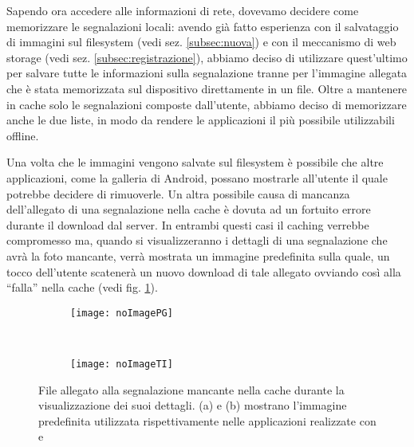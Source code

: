             Sapendo ora accedere alle informazioni di rete, dovevamo decidere
            come memorizzare le segnalazioni locali: avendo già fatto
            esperienza con il salvataggio di immagini sul filesys\-tem (vedi
            sez. \ref{subsec:nuova}) e con il meccanismo di web
            storage (vedi sez. \ref{subsec:registrazione}), abbiamo deciso di
            utilizzare quest'ultimo per salvare tutte le informazioni sulla
            segnalazione tranne per l'immagine allegata che è stata memorizzata
            sul dispositivo direttamente in un file. Oltre a mantenere in cache
            solo le segnalazioni composte dall'utente, abbiamo deciso di
            memorizzare anche le due liste, in modo da rendere le applicazioni
            il più possibile utilizzabili offline.

            Una volta che le immagini vengono salvate sul filesys\-tem è
            possibile che altre applicazioni, come la galleria di Android,
            possano mostrarle all'utente il quale potrebbe decidere di
            rimuoverle. Un altra possibile causa di mancanza dell'allegato di
            una segnalazione nella cache è dovuta ad un fortuito errore durante
            il download dal server. In entrambi questi casi il caching verrebbe
            compromesso ma, quando si visualizzeranno i dettagli di una
            segnalazione che avrà la foto mancante, verrà mostrata un immagine
            predefinita sulla quale, un tocco dell'utente scatenerà un nuovo
            download di tale allegato ovviando così alla ``falla'' nella cache
            (vedi fig. \ref{fig:noImages}).
            \begin{figure}[h]
                \centering
                \begin{subfigure}[b]{0.485\textwidth}
                    \texttt{[image: noImagePG]}
                    \caption{}
                \end{subfigure}
                ~
                \begin{subfigure}[b]{0.485\textwidth}
                    \texttt{[image: noImageTI]}
                    \caption{}
                \end{subfigure}
                \caption{
                    File allegato alla segnalazione mancante nella cache durante
                    la visualizzazione dei suoi dettagli. (a) e (b) mostrano
                    l'immagine predefinita utilizzata rispettivamente
                    nelle applicazioni realizzate con \pg{} e \tisdk{}
                }
                \label{fig:noImages}
            \end{figure}


